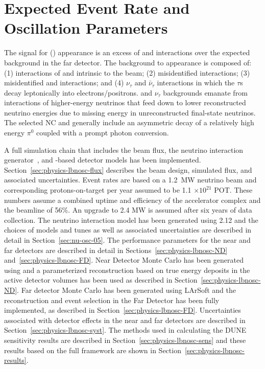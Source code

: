 \section{Expected Event Rate and Oscillation Parameters}
\label{sec:physics-lbnosc-osc}




The signal for \nue (\anue) appearance is an excess of  %
\nue and \anue interactions over the expected background in the far detector.  The background to \nue appearance is composed of: (1)  interactions of \nue and \anue intrinsic to the beam; (2) misidentified  %
interactions;  (3) misidentified \numu and \anumu {} interactions; and (4) $\nu_\tau$ and $\bar{\nu}_\tau$  interactions in which the $\tau$s decay leptonically into electrons/positrons.  and $\nu_\tau$ backgrounds emanate from interactions of higher-energy neutrinos that feed down to lower reconstructed neutrino energies due to missing energy in unreconstructed final-state neutrinos. The selected NC and  \numu generally include an asymmetric decay of a relatively high energy $\pi^0$ coupled with a prompt photon conversion.

A full simulation chain that includes the beam flux, the  %
neutrino interaction
generator~\cite{Andreopoulos:2009rq}, and -based %
detector models has been implemented. Section~\ref{sec:physics-lbnosc-flux} describes the beam design, simulated flux, and associated uncertainties.
Event rates are based on a 1.2~MW neutrino beam and corresponding protons-on-target per year assumed to be 1.1 $\times 10^{21}$ POT.  These numbers assume a combined uptime and efficiency of the  accelerator complex and the  beamline of 56\%.
An upgrade to 2.4 MW is assumed after six years of data collection. The neutrino interaction model has been generated using  2.12 and the choices of models and tunes as well as associated uncertainties are described in detail in Section~\ref{sec:nu-osc-05}. The performance parameters for the near and far detectors are described in detail in Sections~\ref{sec:physics-lbnosc-ND} and~\ref{sec:physics-lbnosc-FD}. 
 Near Detector Monte Carlo has been generated using  and a parameterized reconstruction based on true energy deposits in the active detector volumes has been used as described in Section~\ref{sec:physics-lbnosc-ND}.
 Far detector Monte Carlo has been generated using LArSoft and the reconstruction and event selection in the Far Detector has been fully implemented, as described in Section~\ref{sec:physics-lbnosc-FD}. Uncertainties associated with detector effects in the near and far detectors are described in Section~\ref{sec:physics-lbnosc-syst}. The methods used in calculating the DUNE sensitivity results are described in Section~\ref{sec:physics-lbnosc-sens} and these results based on the full framework are shown in Section~\ref{sec:physics-lbnosc-results}.

